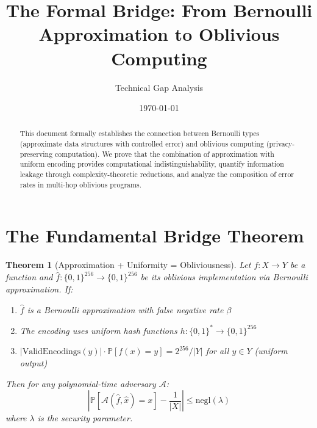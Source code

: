 \documentclass[11pt]{article}
\title{The Formal Bridge: From Bernoulli Approximation to Oblivious Computing}
\author{Technical Gap Analysis}
\date{\today}
\newtheorem{theorem}{Theorem}[section]
\newcommand{\Obv}[1]{\widehat{#1}}
\newcommand{\ValidEnc}[1]{\text{ValidEncodings}(#1)}
\newcommand{\Prob}[1]{\mathbb{P}[#1]}
\newcommand{\negl}{\text{negl}}
\begin{document}
\maketitle

\begin{abstract}
This document formally establishes the connection between Bernoulli types (approximate data structures with controlled error) and oblivious computing (privacy-preserving computation). We prove that the combination of approximation with uniform encoding provides computational indistinguishability, quantify information leakage through complexity-theoretic reductions, and analyze the composition of error rates in multi-hop oblivious programs.
\end{abstract}

\section{The Fundamental Bridge Theorem}

\begin{theorem}[Approximation + Uniformity = Obliviousness]
Let $f: X \to Y$ be a function and $\Obv{f}: \{0,1\}^{256} \to \{0,1\}^{256}$ be its oblivious implementation via Bernoulli approximation. If:
\begin{enumerate}
    \item $\Obv{f}$ is a Bernoulli approximation with false negative rate $\beta$
    \item The encoding uses uniform hash functions $h: \{0,1\}^* \to \{0,1\}^{256}$
    \item $|\ValidEnc{y}| \cdot \Prob{f(x) = y} = 2^{256}/|Y|$ for all $y \in Y$ (uniform output)
\end{enumerate}
Then for any polynomial-time adversary $\mathcal{A}$:
\[
\left| \Prob{\mathcal{A}(\Obv{f}, \Obv{x}) = x} - \frac{1}{|X|} \right| \leq \negl(\lambda)
\]
where $\lambda$ is the security parameter.
\end{theorem}
\end{document}
